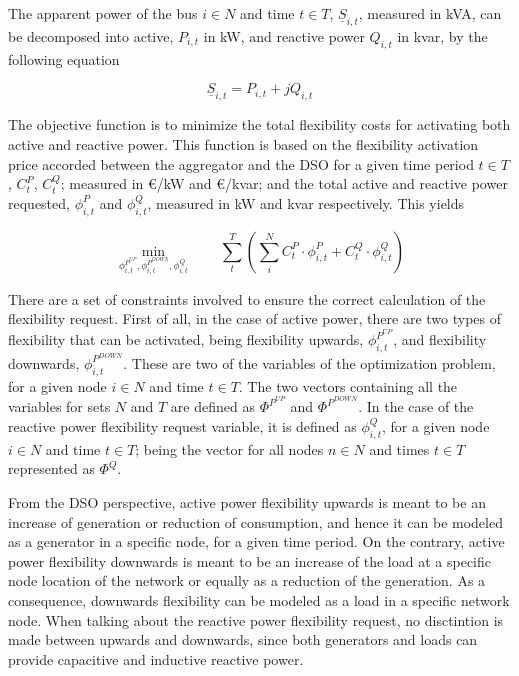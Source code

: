 The apparent power of the bus $i \in N$ and time $t \in T$, $\underline{S}_{i,t}$, measured in kVA, can be decomposed into active, $P_{i,t}$ in kW, and reactive power $Q_{i,t}$ in kvar, by the following equation 

\begin{equation*}
\underline{S}_{i,t} = P_{i,t} + jQ_{i,t}
\end{equation*}

The objective function is to minimize the total flexibility costs for activating both active and reactive power. This function is based on the flexibility activation price accorded between the aggregator and the DSO for a given time period $t \in T$, $C_t^{P}$, $C_t^{Q}$; measured in \euro/kW and \euro/kvar;  and the total active and reactive power requested, $\phi_{i,t}^{P}$ and $\phi_{i,t}^{Q}$, measured in kW and kvar respectively. This yields

\begin{equation*}
\!\min_{\phi_{i,t}^{P^{UP}},\phi_{i,t}^{P^{DOWN}},\phi_{i,t}^{Q}}  \qquad \sum_{t}^{T} \left( \sum_{i}^{N} C_t^{P} \cdot \phi_{i,t}^{P} + C_t^{Q} \cdot \phi_{i,t}^{Q} \right)  
\end{equation*}

There are a set of constraints involved to ensure the correct calculation of the flexibility request. First of all, in the case of active power, there are two types of flexibility that can be activated, being flexibility upwards, $\phi_{i,t}^{P^{UP}}$, and flexibility downwards, $\phi_{i,t}^{P^{DOWN}}$. These are two of the variables of the optimization problem, for a given node $i \in N$ and time $t \in T$. The two vectors containing all the variables for sets $N$ and $T$ are defined as $\Phi^{P^{UP}}$ and $\Phi^{P^{DOWN}}$. In the case of the reactive power flexibility request variable, it is defined as $\phi_{i,t}^{Q}$, for a given node $i \in N$ and time $t \in T$; being the vector for all nodes $n \in N$ and times $t \in T$ represented as $\Phi^{Q}$.

From the DSO perspective, active power flexibility upwards is meant to be an increase of generation or reduction of consumption, and hence it can be modeled as a generator in a specific node, for a given time period. On the contrary, active power flexibility downwards is meant to be an increase of the load at a specific node location of the network or equally as a reduction of the generation. As a consequence, downwards flexibility can be modeled as a load in a specific network node. When talking about the reactive power flexibility request, no disctintion is made between upwards and downwards, since both generators and loads can provide capacitive and inductive reactive power. 

